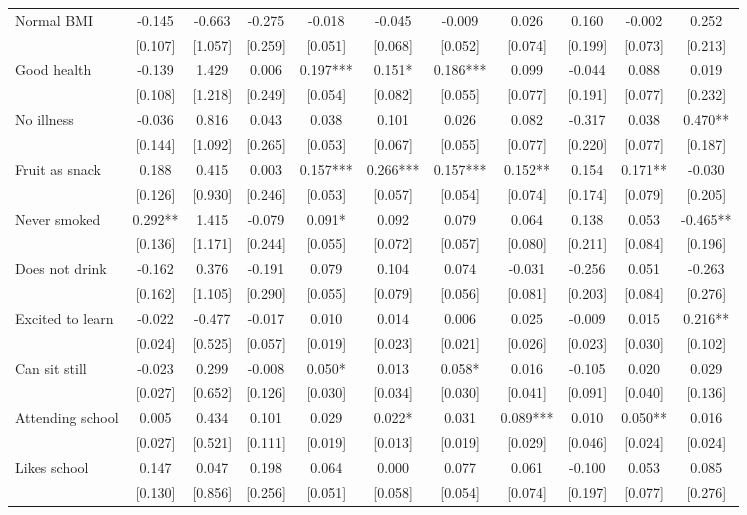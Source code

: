 \documentclass[12pt]{article}
\begin{document}
\begin{table}[ht]
\begin{center}
\begin{adjustbox}{width=1.2\textwidth,center=\textwidth}
\begin{tabular}{l*{10}{c}}
Normal BMI & -0.145 & -0.663 & -0.275 & -0.018 & -0.045 & -0.009 & 0.026 & 0.160 & -0.002 & 0.252 \\
 & [0.107] & [1.057] & [0.259] & [0.051] & [0.068] & [0.052] & [0.074] & [0.199] & [0.073] & [0.213] \\
Good health & -0.139 & 1.429 & 0.006 & 0.197*** & 0.151* & 0.186*** & 0.099 & -0.044 & 0.088 & 0.019 \\
 & [0.108] & [1.218] & [0.249] & [0.054] & [0.082] & [0.055] & [0.077] & [0.191] & [0.077] & [0.232] \\
No illness & -0.036 & 0.816 & 0.043 & 0.038 & 0.101 & 0.026 & 0.082 & -0.317 & 0.038 & 0.470** \\
 & [0.144] & [1.092] & [0.265] & [0.053] & [0.067] & [0.055] & [0.077] & [0.220] & [0.077] & [0.187] \\
Fruit as snack & 0.188 & 0.415 & 0.003 & 0.157*** & 0.266*** & 0.157*** & 0.152** & 0.154 & 0.171** & -0.030 \\
 & [0.126] & [0.930] & [0.246] & [0.053] & [0.057] & [0.054] & [0.074] & [0.174] & [0.079] & [0.205] \\
Never smoked & 0.292** & 1.415 & -0.079 & 0.091* & 0.092 & 0.079 & 0.064 & 0.138 & 0.053 & -0.465** \\
 & [0.136] & [1.171] & [0.244] & [0.055] & [0.072] & [0.057] & [0.080] & [0.211] & [0.084] & [0.196] \\
Does not drink & -0.162 & 0.376 & -0.191 & 0.079 & 0.104 & 0.074 & -0.031 & -0.256 & 0.051 & -0.263 \\
 & [0.162] & [1.105] & [0.290] & [0.055] & [0.079] & [0.056] & [0.081] & [0.203] & [0.084] & [0.276] \\
Excited to learn & -0.022 & -0.477 & -0.017 & 0.010 & 0.014 & 0.006 & 0.025 & -0.009 & 0.015 & 0.216** \\
 & [0.024] & [0.525] & [0.057] & [0.019] & [0.023] & [0.021] & [0.026] & [0.023] & [0.030] & [0.102] \\
Can sit still & -0.023 & 0.299 & -0.008 & 0.050* & 0.013 & 0.058* & 0.016 & -0.105 & 0.020 & 0.029 \\
 & [0.027] & [0.652] & [0.126] & [0.030] & [0.034] & [0.030] & [0.041] & [0.091] & [0.040] & [0.136] \\
Attending school & 0.005 & 0.434 & 0.101 & 0.029 & 0.022* & 0.031 & 0.089*** & 0.010 & 0.050** & 0.016 \\
 & [0.027] & [0.521] & [0.111] & [0.019] & [0.013] & [0.019] & [0.029] & [0.046] & [0.024] & [0.024] \\
Likes school & 0.147 & 0.047 & 0.198 & 0.064 & 0.000 & 0.077 & 0.061 & -0.100 & 0.053 & 0.085 \\
 & [0.130] & [0.856] & [0.256] & [0.051] & [0.058] & [0.054] & [0.074] & [0.197] & [0.077] & [0.276] \\


\end{tabular}
\end{adjustbox}
\end{center}
\end{table}
\end{document}

